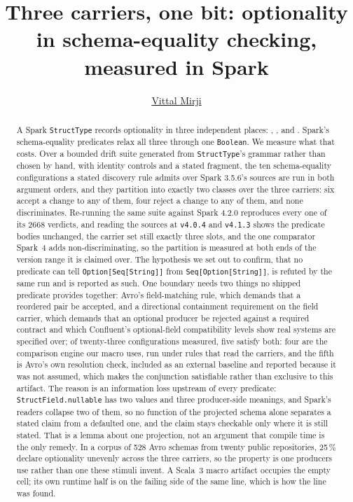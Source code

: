 \documentclass[sigplan,screen,nonacm]{acmart}
\title[Three carriers, one bit]{Three carriers, one bit: optionality in schema-equality checking, measured in Spark}
\author{\href{https://vitthalmirji.com/}{Vittal Mirji}}
\affiliation{
  \position{Staff Software Engineer \& Independent researcher}
  \country{ }
}
\begin{document}
\begin{abstract}
A Spark \texttt{StructType} records optionality in three independent places: , , and . Spark's schema-equality predicates relax all three through one \texttt{Boolean}. We measure what that costs. Over a bounded drift suite generated from \texttt{StructType}'s grammar rather than chosen by hand, with identity controls and a stated fragment, the ten schema-equality configurations a stated discovery rule admits over Spark 3.5.6's sources are run in both argument orders, and they partition into exactly two classes over the three carriers: six accept a change to any of them, four reject a change to any of them, and none discriminates. Re-running the same suite against Spark 4.2.0 reproduces every one of its 2668 verdicts, and reading the sources at \texttt{v4.0.4} and \texttt{v4.1.3} shows the predicate bodies unchanged, the carrier set still exactly three slots, and the one comparator Spark~4 adds non-discriminating, so the partition is measured at both ends of the version range it is claimed over. The hypothesis we set out to confirm, that no predicate can tell \texttt{Option[Seq[String]]} from \texttt{Seq[Option[String]]}, is refuted by the same run and is reported as such. One boundary needs two things no shipped predicate provides together: Avro's field-matching rule, which demands that a reordered pair be accepted, and a directional containment requirement on the field carrier, which demands that an optional producer be rejected against a required contract and which Confluent's optional-field compatibility levels show real systems are specified over; of twenty-three configurations measured, five satisfy both: four are the comparison engine our macro uses, run under rules that read the carriers, and the fifth is Avro's own resolution check, included as an external baseline and reported because it was not assumed, which makes the conjunction satisfiable rather than exclusive to this artifact. The reason is an information loss upstream of every predicate: \texttt{StructField.nullable} has two values and three producer-side meanings, and Spark's readers collapse two of them, so no function of the projected schema alone separates a stated claim from a defaulted one, and the claim stays checkable only where it is still stated. That is a lemma about one projection, not an argument that compile time is the only remedy. In a corpus of 528 Avro schemas from twenty public repositories, 25\,\% declare optionality unevenly across the three carriers, so the property is one producers use rather than one these stimuli invent. A Scala~3 macro artifact occupies the empty cell; its own runtime half is on the failing side of the same line, which is how the line was found.
\end{abstract}
\end{document}
